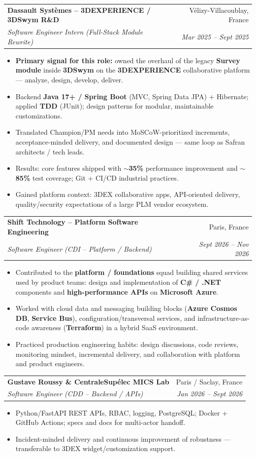 \documentclass[letterpaper,10.5pt]{article}
\makeatletter
\newcommand{\resumeItem}[1]{\item\small{#1 \vspace{-1.5pt}}}
\newcommand{\resumeSubheading}[4]{
  \vspace{-1pt}\item
    \begin{tabular*}{0.97\textwidth}[t]{l@{\extracolsep{\fill}}r}
      \textbf{#1} & #2 \\
      \textit{\small#3} & \textit{\small #4} \\
    \end{tabular*}\vspace{-5pt}
}
\newcommand{\resumeItemListStart}{\begin{itemize}[leftmargin=0.18in]}
\newcommand{\resumeItemListEnd}{\end{itemize}\vspace{-3pt}}
\makeatother
\begin{document}
  \resumeSubheading
    {Dassault Syst\`emes -- 3DEXPERIENCE / 3DSwym R\&D}{V\'elizy-Villacoublay, France}
    {Software Engineer Intern (Full-Stack Module Rewrite)}{Mar 2025 -- Sept 2025}
    \resumeItemListStart
      \resumeItem{\textbf{Primary signal for this role:} owned the overhaul of the legacy \textbf{Survey module} inside \textbf{3DSwym} on the \textbf{3DEXPERIENCE} collaborative platform --- analyze, design, develop, deliver.}
      \resumeItem{Backend \textbf{Java 17+ / Spring Boot} (MVC, Spring Data JPA) + Hibernate; applied \textbf{TDD} (JUnit); design patterns for modular, maintainable customizations.}
      \resumeItem{Translated Champion/PM needs into MoSCoW-prioritized increments, acceptance-minded delivery, and documented design --- same loop as Safran architects / tech leads.}
      \resumeItem{Results: core features shipped with \textbf{$\sim$35\%} performance improvement and \textbf{$\sim$85\%} test coverage; Git + CI/CD industrial practices.}
      \resumeItem{Gained platform context: 3DEX collaborative apps, API-oriented delivery, quality/security expectations of a large PLM vendor ecosystem.}
    \resumeItemListEnd

  \resumeSubheading
    {Shift Technology -- Platform Software Engineering}{Paris, France}
    {Software Engineer (CDI -- Platform / Backend)}{Sept 2026 -- Nov 2026}
    \resumeItemListStart
      \resumeItem{Contributed to the \textbf{platform / foundations} squad building shared services used by product teams: design and implementation of \textbf{C\# / .NET} components and \textbf{high-performance APIs} on \textbf{Microsoft Azure}.}
      \resumeItem{Worked with cloud data and messaging building blocks (\textbf{Azure Cosmos DB}, \textbf{Service Bus}), configuration/transversal services, and infrastructure-as-code awareness (\textbf{Terraform}) in a hybrid SaaS environment.}
      \resumeItem{Practiced production engineering habits: design discussions, code reviews, monitoring mindset, incremental delivery, and collaboration with platform and product engineers.}
    \resumeItemListEnd

  \resumeSubheading
    {Gustave Roussy \& CentraleSup\'elec MICS Lab}{Paris / Saclay, France}
    {Software Engineer (CDD -- Backend / APIs)}{Jan 2026 -- Sept 2026}
    \resumeItemListStart
      \resumeItem{Python/FastAPI REST APIs, RBAC, logging, PostgreSQL; Docker + GitHub Actions; specs and docs for multi-actor handoff.}
      \resumeItem{Incident-minded delivery and continuous improvement of robustness --- transferable to 3DEX widget/customization support.}
    \resumeItemListEnd
\end{document}
